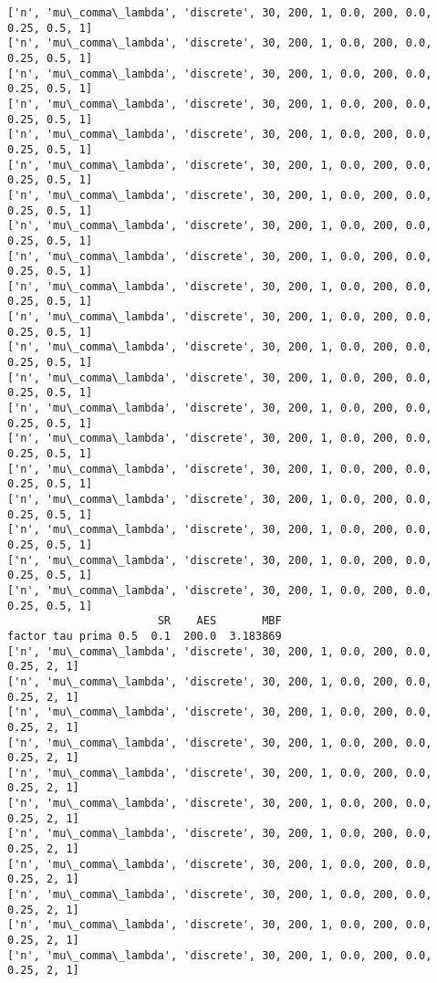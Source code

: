 \documentclass[11pt]{article}
\begin{document}
    \begin{Verbatim}[commandchars=\\\{\}]
['n', 'mu\_comma\_lambda', 'discrete', 30, 200, 1, 0.0, 200, 0.0, 0.25, 0.5, 1]
['n', 'mu\_comma\_lambda', 'discrete', 30, 200, 1, 0.0, 200, 0.0, 0.25, 0.5, 1]
['n', 'mu\_comma\_lambda', 'discrete', 30, 200, 1, 0.0, 200, 0.0, 0.25, 0.5, 1]
['n', 'mu\_comma\_lambda', 'discrete', 30, 200, 1, 0.0, 200, 0.0, 0.25, 0.5, 1]
['n', 'mu\_comma\_lambda', 'discrete', 30, 200, 1, 0.0, 200, 0.0, 0.25, 0.5, 1]
['n', 'mu\_comma\_lambda', 'discrete', 30, 200, 1, 0.0, 200, 0.0, 0.25, 0.5, 1]
['n', 'mu\_comma\_lambda', 'discrete', 30, 200, 1, 0.0, 200, 0.0, 0.25, 0.5, 1]
['n', 'mu\_comma\_lambda', 'discrete', 30, 200, 1, 0.0, 200, 0.0, 0.25, 0.5, 1]
['n', 'mu\_comma\_lambda', 'discrete', 30, 200, 1, 0.0, 200, 0.0, 0.25, 0.5, 1]
['n', 'mu\_comma\_lambda', 'discrete', 30, 200, 1, 0.0, 200, 0.0, 0.25, 0.5, 1]
['n', 'mu\_comma\_lambda', 'discrete', 30, 200, 1, 0.0, 200, 0.0, 0.25, 0.5, 1]
['n', 'mu\_comma\_lambda', 'discrete', 30, 200, 1, 0.0, 200, 0.0, 0.25, 0.5, 1]
['n', 'mu\_comma\_lambda', 'discrete', 30, 200, 1, 0.0, 200, 0.0, 0.25, 0.5, 1]
['n', 'mu\_comma\_lambda', 'discrete', 30, 200, 1, 0.0, 200, 0.0, 0.25, 0.5, 1]
['n', 'mu\_comma\_lambda', 'discrete', 30, 200, 1, 0.0, 200, 0.0, 0.25, 0.5, 1]
['n', 'mu\_comma\_lambda', 'discrete', 30, 200, 1, 0.0, 200, 0.0, 0.25, 0.5, 1]
['n', 'mu\_comma\_lambda', 'discrete', 30, 200, 1, 0.0, 200, 0.0, 0.25, 0.5, 1]
['n', 'mu\_comma\_lambda', 'discrete', 30, 200, 1, 0.0, 200, 0.0, 0.25, 0.5, 1]
['n', 'mu\_comma\_lambda', 'discrete', 30, 200, 1, 0.0, 200, 0.0, 0.25, 0.5, 1]
['n', 'mu\_comma\_lambda', 'discrete', 30, 200, 1, 0.0, 200, 0.0, 0.25, 0.5, 1]
                       SR    AES       MBF
factor tau prima 0.5  0.1  200.0  3.183869
['n', 'mu\_comma\_lambda', 'discrete', 30, 200, 1, 0.0, 200, 0.0, 0.25, 2, 1]
['n', 'mu\_comma\_lambda', 'discrete', 30, 200, 1, 0.0, 200, 0.0, 0.25, 2, 1]
['n', 'mu\_comma\_lambda', 'discrete', 30, 200, 1, 0.0, 200, 0.0, 0.25, 2, 1]
['n', 'mu\_comma\_lambda', 'discrete', 30, 200, 1, 0.0, 200, 0.0, 0.25, 2, 1]
['n', 'mu\_comma\_lambda', 'discrete', 30, 200, 1, 0.0, 200, 0.0, 0.25, 2, 1]
['n', 'mu\_comma\_lambda', 'discrete', 30, 200, 1, 0.0, 200, 0.0, 0.25, 2, 1]
['n', 'mu\_comma\_lambda', 'discrete', 30, 200, 1, 0.0, 200, 0.0, 0.25, 2, 1]
['n', 'mu\_comma\_lambda', 'discrete', 30, 200, 1, 0.0, 200, 0.0, 0.25, 2, 1]
['n', 'mu\_comma\_lambda', 'discrete', 30, 200, 1, 0.0, 200, 0.0, 0.25, 2, 1]
['n', 'mu\_comma\_lambda', 'discrete', 30, 200, 1, 0.0, 200, 0.0, 0.25, 2, 1]
['n', 'mu\_comma\_lambda', 'discrete', 30, 200, 1, 0.0, 200, 0.0, 0.25, 2, 1]

\end{Verbatim}
\end{document}
